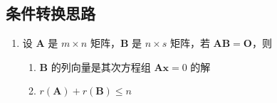 \documentclass[a4paper,12pt]{article}
\begin{document}
    \subsection{条件转换思路}

    \begin{enumerate}
        \item 设 $\mathbf{A}$ 是 $m \times n$ 矩阵，$\mathbf{B}$ 是 $n \times s$ 矩阵，若 $\mathbf{AB} = \mathbf{O}$，则
        \begin{enumerate}
            \item $\mathbf{B}$ 的列向量是其次方程组 $\mathbf{Ax} = 0$ 的解
            \item $r(\mathbf{A}) + r(\mathbf{B}) \le n$
        \end{enumerate}
    \end{enumerate}
\end{document}
